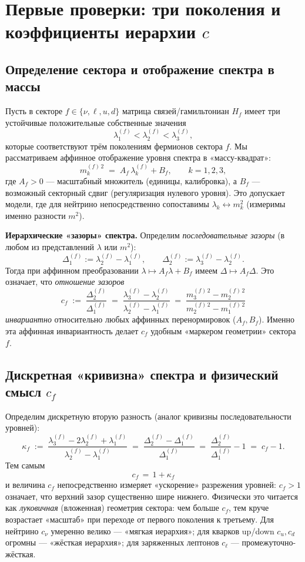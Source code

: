 \section{Первые проверки: три поколения и коэффициенты иерархии $c$}
\label{sec:first-checks}

\subsection{Определение сектора и отображение спектра в массы}
Пусть в секторе $f\in\{\nu,\ell,u,d\}$ матрица связей/гамильтониан $H_f$ имеет
три устойчивые положительные собственные значения
\[
\lambda^{(f)}_1 < \lambda^{(f)}_2 < \lambda^{(f)}_3,
\]
которые соответствуют трём поколениям фермионов сектора $f$.
Мы рассматриваем аффинное отображение уровня спектра в «массу-квадрат»:
\[
m^{(f)\,2}_k \;=\; A_f\,\lambda^{(f)}_k + B_f,\qquad k=1,2,3,
\]
где $A_f>0$ — масштабный множитель (единицы, калибровка),
а $B_f$ — возможный секторный сдвиг (регуляризация нулевого уровня).
Это допускает модели, где для нейтрино непосредственно сопоставимы
\(\lambda_k \leftrightarrow m_k^2\) (измеримы именно разности \(m^2\)).

\vspace{4pt}
\noindent\textbf{Иерархические «зазоры» спектра.}
Определим \emph{последовательные зазоры} (в любом из представлений \(\lambda\) или \(m^2\)):
\[
\Delta^{(f)}_1 := \lambda^{(f)}_2 - \lambda^{(f)}_1,\qquad
\Delta^{(f)}_2 := \lambda^{(f)}_3 - \lambda^{(f)}_2.
\]
Тогда при аффинном преобразовании \(\lambda\mapsto A_f \lambda + B_f\) имеем
\(\Delta \mapsto A_f \Delta\). Это означает, что \emph{отношение зазоров}
\[
\boxed{\quad c_f \;:=\; \frac{\Delta^{(f)}_2}{\Delta^{(f)}_1}
\;=\; \frac{\lambda^{(f)}_3 - \lambda^{(f)}_2}{\lambda^{(f)}_2 - \lambda^{(f)}_1}
\;=\; \frac{m^{(f)\,2}_3 - m^{(f)\,2}_2}{m^{(f)\,2}_2 - m^{(f)\,2}_1}\quad}
\]
\emph{инвариантно} относительно любых аффинных перенормировок (\(A_f,B_f\)).
Именно эта аффинная инвариантность делает \(c_f\) удобным «маркером геометрии» сектора $f$.

\subsection{Дискретная «кривизна» спектра и физический смысл $c_f$}
Определим дискретную вторую разность (аналог кривизны последовательности уровней):
\[
\kappa_f \;:=\; \frac{\lambda^{(f)}_3 - 2\lambda^{(f)}_2 + \lambda^{(f)}_1}{\lambda^{(f)}_2 - \lambda^{(f)}_1}
\;=\; \frac{\Delta^{(f)}_2 - \Delta^{(f)}_1}{\Delta^{(f)}_1}
\;=\; \frac{\Delta^{(f)}_2}{\Delta^{(f)}_1} - 1
\;=\; c_f - 1.
\]
Тем самым
\[
\boxed{\quad c_f \,=\, 1+\kappa_f \quad}
\]
и величина \(c_f\) непосредственно измеряет «ускорение» разрежения уровней:
\(c_f>1\) означает, что верхний зазор существенно шире нижнего.
Физически это читается как \emph{луковичная} (вложенная) геометрия сектора:
чем больше \(c_f\), тем круче возрастает «масштаб» при переходе от первого поколения к третьему.
Для нейтрино \(c_\nu\) умеренно велико — «мягкая иерархия»;
для кварков up/down \(c_u,c_d\) огромны — «жёсткая иерархия»;
для заряженных лептонов \(c_\ell\) — промежуточно-жёсткая.


